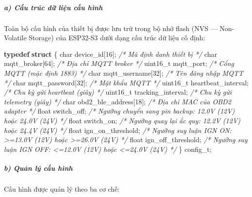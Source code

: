 \documentclass[a4paper]{extarticle}
\newenvironment{Shaded}{}{}
\newcommand{\CommentTok}[1]{\textcolor[rgb]{0.38,0.63,0.69}{\textit{#1}}}
\newcommand{\DataTypeTok}[1]{\textcolor[rgb]{0.56,0.13,0.00}{#1}}
\newcommand{\DecValTok}[1]{\textcolor[rgb]{0.25,0.63,0.44}{#1}}
\newcommand{\KeywordTok}[1]{\textcolor[rgb]{0.00,0.44,0.13}{\textbf{#1}}}
\newcommand{\NormalTok}[1]{#1}
\newcommand{\OperatorTok}[1]{\textcolor[rgb]{0.40,0.40,0.40}{#1}}
\begin{document}
\subparagraph{a) Cấu trúc dữ liệu cấu
hình}\label{a-cux1ea5u-truxfac-dux1eef-liux1ec7u-cux1ea5u-huxecnh}

Toàn bộ cấu hình của thiết bị được lưu trữ trong bộ nhớ flash (NVS ---
Non-Volatile Storage) của ESP32-S3 dưới dạng cấu trúc dữ liệu cố định:

\begin{Shaded}
\begin{Highlighting}[]
\KeywordTok{typedef} \KeywordTok{struct} \OperatorTok{\{}
    \DataTypeTok{char}\NormalTok{     device\_id}\OperatorTok{[}\DecValTok{16}\OperatorTok{];}          \CommentTok{/* Mã định danh thiết bị */}
    \DataTypeTok{char}\NormalTok{     mqtt\_broker}\OperatorTok{[}\DecValTok{64}\OperatorTok{];}        \CommentTok{/* Địa chỉ MQTT broker */}
    \DataTypeTok{uint16\_t}\NormalTok{ mqtt\_port}\OperatorTok{;}              \CommentTok{/* Cổng MQTT (mặc định 1883) */}
    \DataTypeTok{char}\NormalTok{     mqtt\_username}\OperatorTok{[}\DecValTok{32}\OperatorTok{];}      \CommentTok{/* Tên đăng nhập MQTT */}
    \DataTypeTok{char}\NormalTok{     mqtt\_password}\OperatorTok{[}\DecValTok{32}\OperatorTok{];}      \CommentTok{/* Mật khẩu MQTT */}
    \DataTypeTok{uint16\_t}\NormalTok{ heartbeat\_interval}\OperatorTok{;}     \CommentTok{/* Chu kỳ gửi heartbeat (giây) */}
    \DataTypeTok{uint16\_t}\NormalTok{ tracking\_interval}\OperatorTok{;}      \CommentTok{/* Chu kỳ gửi telemetry (giây) */}
    \DataTypeTok{char}\NormalTok{     obd2\_ble\_address}\OperatorTok{[}\DecValTok{18}\OperatorTok{];}   \CommentTok{/* Địa chỉ MAC của OBD2 adapter */}
    \DataTypeTok{float}\NormalTok{    switch\_off}\OperatorTok{;}             \CommentTok{/* Ngưỡng chuyển sang pin backup: 12.0V (12V) hoặc 24.0V (24V) */}
    \DataTypeTok{float}\NormalTok{    switch\_on}\OperatorTok{;}              \CommentTok{/* Ngưỡng quay lại ắc quy: 12.2V (12V) hoặc 24.4V (24V) */}
    \DataTypeTok{float}\NormalTok{    ign\_on\_threshold}\OperatorTok{;}       \CommentTok{/* Ngưỡng suy luận IGN ON: \textgreater{}=13.0V (12V) hoặc \textgreater{}=26.0V (24V) */}
    \DataTypeTok{float}\NormalTok{    ign\_off\_threshold}\OperatorTok{;}      \CommentTok{/* Ngưỡng suy luận IGN OFF: \textless{}=12.0V (12V) hoặc \textless{}=24.0V (24V) */}
\OperatorTok{\}}\NormalTok{ config\_t}\OperatorTok{;}
\end{Highlighting}
\end{Shaded}

\subparagraph{b) Quản lý cấu
hình}\label{b-quux1ea3n-luxfd-cux1ea5u-huxecnh}

Cấu hình được quản lý theo ba cơ chế:
\end{document}
